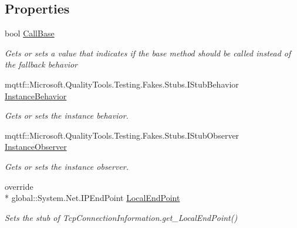 \subsection*{Properties}
\begin{DoxyCompactItemize}
\item 
bool \hyperlink{class_system_1_1_net_1_1_network_information_1_1_fakes_1_1_stub_tcp_connection_information_ae30d6d077dffd759d48248aa33d0361b}{Call\-Base}
\begin{DoxyCompactList}\small\item\em Gets or sets a value that indicates if the base method should be called instead of the fallback behavior\end{DoxyCompactList}\item 
mqttf\-::\-Microsoft.\-Quality\-Tools.\-Testing.\-Fakes.\-Stubs.\-I\-Stub\-Behavior \hyperlink{class_system_1_1_net_1_1_network_information_1_1_fakes_1_1_stub_tcp_connection_information_a13182c1709c5d17c96db2c840320994b}{Instance\-Behavior}
\begin{DoxyCompactList}\small\item\em Gets or sets the instance behavior.\end{DoxyCompactList}\item 
mqttf\-::\-Microsoft.\-Quality\-Tools.\-Testing.\-Fakes.\-Stubs.\-I\-Stub\-Observer \hyperlink{class_system_1_1_net_1_1_network_information_1_1_fakes_1_1_stub_tcp_connection_information_afc7fc612718e743168b632403240de6b}{Instance\-Observer}
\begin{DoxyCompactList}\small\item\em Gets or sets the instance observer.\end{DoxyCompactList}\item 
override \\*
global\-::\-System.\-Net.\-I\-P\-End\-Point \hyperlink{class_system_1_1_net_1_1_network_information_1_1_fakes_1_1_stub_tcp_connection_information_ac486609aa176f5f78a48f0f2d8ac91d8}{Local\-End\-Point}
\begin{DoxyCompactList}\small\item\em Sets the stub of Tcp\-Connection\-Information.\-get\-\_\-\-Local\-End\-Point()\end{DoxyCompactList}\item 

\end{DoxyCompactItemize}
